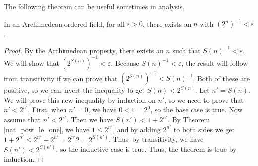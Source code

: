 \documentclass[../../math.tex]{subfiles}
\begin{document}
The following theorem can be useful sometimes in analysis.

\begin{theorem}
    In an Archimedean ordered field, for all $\varepsilon > 0$, there exists an
    $n$ with $(2^n)^{-1} < \varepsilon$.
\end{theorem}
\begin{proof}
    By the Archimedean property, there exists an $n$ such that $S(n)^{-1} <
    \varepsilon$.  We will show that $(2^{S(n)})^{-1} < \varepsilon$.  Because
    $S(n)^{-1} < \varepsilon$, the result will follow from transitivity if we
    can prove that $(2^{S(n)})^{-1} < S(n)^{-1}$.  Both of these are positive,
    so we can invert the inequality to get $S(n) < 2^{S(n)}$.  Let $n' = S(n)$.
    We will prove this new inequality by induction on $n'$, so we need to prove
    that $n' < 2^{n'}$.  First, when $n' = 0$, we have $0 < 1 = 2^0$, so the
    base case is true.  Now assume that $n' < 2^{n'}$.  Then we have $S(n') < 1
    + 2^{n'}$.  By Theorem \ref{nat_pow_le_one}, we have $1 \leq 2^{n'}$, and by
    adding $2^{n'}$ to both sides we get $1 + 2^{n'} \leq 2^{n'} + 2^{n'} =
    2^{n'}2 = 2^{S(n')}$.  Thus, by transitivity, we have $S(n') < 2^{S(n')}$,
    so the inductive case is true.  Thus, the theorem is true by induction.
\end{proof}
\end{document}

